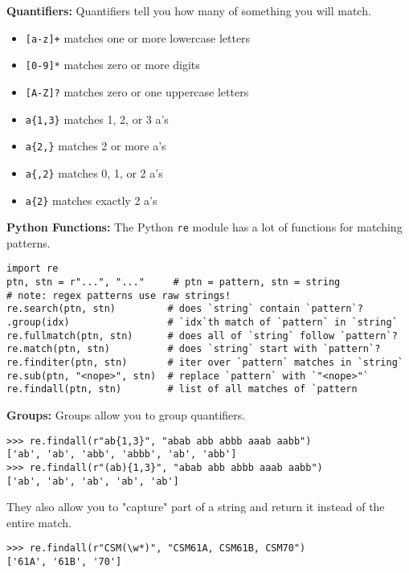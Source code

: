 \textbf{Quantifiers:}
Quantifiers tell you how many of something you will match.
\begin{itemize}
    \item \lstinline$[a-z]+$ matches one or more lowercase letters
    \item \lstinline$[0-9]*$ matches zero or more digits
    \item \lstinline$[A-Z]?$ matches zero or one uppercase letters
    \item \lstinline$a{1,3}$ matches 1, 2, or 3 a's
    \item \lstinline$a{2,}$ matches 2 or more a's
    \item \lstinline$a{,2}$ matches 0, 1, or 2 a's
    \item \lstinline$a{2}$ matches exactly 2 a's
\end{itemize}

\textbf{Python Functions:}
The Python \lstinline$re$ module has a lot of functions for matching patterns.

\begin{lstlisting}
import re
ptn, stn = r"...", "..."     # ptn = pattern, stn = string
# note: regex patterns use raw strings!
re.search(ptn, stn)         # does `string` contain `pattern`?
.group(idx)                 # `idx`th match of `pattern` in `string`
re.fullmatch(ptn, stn)      # does all of `string` follow `pattern`?
re.match(ptn, stn)          # does `string` start with `pattern`?
re.finditer(ptn, stn)       # iter over `pattern` matches in `string`
re.sub(ptn, "<nope>", stn)  # replace `pattern` with `"<nope>"`
re.findall(ptn, stn)        # list of all matches of `pattern
\end{lstlisting}

\textbf{Groups:}
Groups allow you to group quantifiers.
\begin{lstlisting}
>>> re.findall(r"ab{1,3}", "abab abb abbb aaab aabb")
['ab', 'ab', 'abb', 'abbb', 'ab', 'abb']
>>> re.findall(r"(ab){1,3}", "abab abb abbb aaab aabb")
['ab', 'ab', 'ab', 'ab', 'ab']
\end{lstlisting}
They also allow you to "capture" part of a string and return it instead of the entire match.
\begin{lstlisting}
>>> re.findall(r"CSM(\w*)", "CSM61A, CSM61B, CSM70")
['61A', '61B', '70']
\end{lstlisting}

